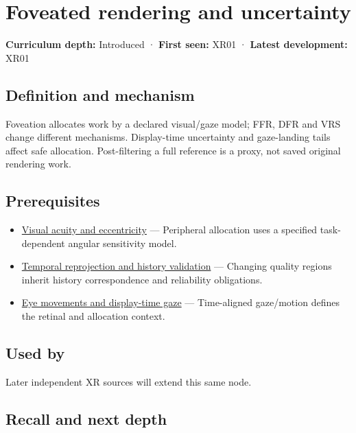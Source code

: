 \hypertarget{appendix-5878b813b732}{}
\section{Foveated rendering and uncertainty}\label{appendix-5878b813b732-foveated-rendering-and-uncertainty}

\textbf{Curriculum depth:} Introduced · \textbf{First seen:} XR01 · \textbf{Latest development:} XR01

\subsection{Definition and mechanism}\label{appendix-5878b813b732-definition-and-mechanism}

Foveation allocates work by a declared visual/gaze model; FFR, DFR and VRS change different mechanisms. Display-time uncertainty and gaze-landing tails affect safe allocation. Post-filtering a full reference is a proxy, not saved original rendering work.

\subsection{Prerequisites}\label{appendix-5878b813b732-prerequisites}

\begin{itemize}
\tightlist
\item
  \hyperref[appendix-b491fc48c54b]{Visual acuity and eccentricity} --- Peripheral allocation uses a specified task-dependent angular sensitivity model.
\item
  \hyperref[appendix-0727340a4428]{Temporal reprojection and history validation} --- Changing quality regions inherit history correspondence and reliability obligations.
\item
  \hyperref[appendix-a6f2c4fe1996]{Eye movements and display-time gaze} --- Time-aligned gaze/motion defines the retinal and allocation context.
\end{itemize}

\subsection{Used by}\label{appendix-5878b813b732-used-by}

Later independent XR sources will extend this same node.

\subsection{Recall and next depth}\label{appendix-5878b813b732-recall-and-next-depth}

